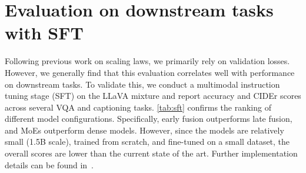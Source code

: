 

\vspace{-1cm}
\section{Evaluation on downstream tasks with SFT} 
Following previous work on scaling laws, we primarily rely on validation losses. However, we generally find that this evaluation correlates well
with performance on downstream tasks. To validate this, we conduct a multimodal
instruction tuning stage (SFT) on the LLaVA mixture \citep{liu2024improvedllava} and report
accuracy and CIDEr scores across several VQA and captioning tasks.
\cref{tab:sft} confirms the ranking of different model configurations.
Specifically, early fusion outperforms late fusion, and MoEs outperform dense
models. However, since the models are relatively small (1.5B scale), trained
from scratch, and fine-tuned on a small dataset, the overall scores
are lower than the current state of the art.  Further implementation
details can be found in~.  


\begin{figure}[t!]
    \begin{minipage}[t]{0.58\textwidth}
        
    \end{minipage}
    \hfill
    \begin{minipage}[t]{0.38\textwidth}
        
    \end{minipage}
    \vspace{3mm}
\end{figure}

